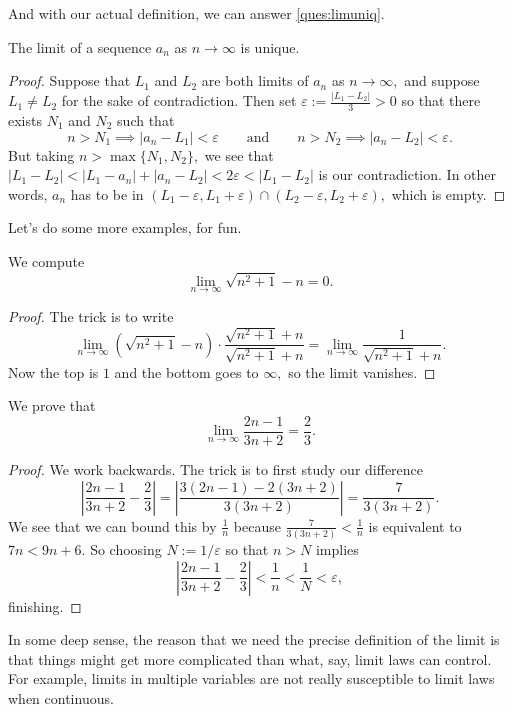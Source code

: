 And with our actual definition, we can answer \autoref{ques:limuniq}.
\begin{proposition}
    The limit of a sequence $a_n$ as $n\to\infty$ is unique.
\end{proposition}
\begin{proof}
    Suppose that $L_1$ and $L_2$ are both limits of $a_n$ as $n\to\infty,$ and suppose $L_1\ne L_2$ for the sake of contradiction. Then set $\varepsilon:=\frac{|L_1-L_2|}3>0$ so that there exists $N_1$ and $N_2$ such that
    \[n>N_1\implies|a_n-L_1|<\varepsilon\qquad\text{and}\qquad n>N_2\implies|a_n-L_2|<\varepsilon.\]
    But taking $n>\max\{N_1,N_2\},$ we see that $|L_1-L_2|<|L_1-a_n|+|a_n-L_2|<2\varepsilon<|L_1-L_2|$ is our contradiction. In other words, $a_n$ has to be in $(L_1-\varepsilon,L_1+\varepsilon)\cap(L_2-\varepsilon,L_2+\varepsilon),$ which is empty.
\end{proof}
Let's do some more examples, for fun.
\begin{exercise}[Ross 7.5(a)]
    We compute
    \[\lim_{n\to\infty}\sqrt{n^2+1}-n=0.\]
\end{exercise}
\begin{proof}
    The trick is to write
    \[\lim_{n\to\infty}\left(\sqrt{n^2+1}-n\right)\cdot\frac{\sqrt{n^2+1}+n}{\sqrt{n^2+1}+n}=\lim_{n\to\infty}\frac1{\sqrt{n^2+1}+n}.\]
    Now the top is $1$ and the bottom goes to $\infty,$ so the limit vanishes.
\end{proof}
\begin{exercise}
    We prove that
    \[\lim_{n\to\infty}\frac{2n-1}{3n+2}=\frac23.\]
\end{exercise}
\begin{proof}
    We work backwards. The trick is to first study our difference
    \[\left|\frac{2n-1}{3n+2}-\frac23\right|=\left|\frac{3(2n-1)-2(3n+2)}{3(3n+2)}\right|=\frac7{3(3n+2)}.\]
    We see that we can bound this by $\frac1n$ because $\frac7{3(3n+2)}<\frac1n$ is equivalent to $7n<9n+6.$ So choosing $\boxed{N:=1/\varepsilon}$ so that $n>N$ implies
    \[\left|\frac{2n-1}{3n+2}-\frac23\right|<\frac1n<\frac1N<\varepsilon,\]
    finishing.
\end{proof}
\begin{remark}[Philosophy]
    In some deep sense, the reason that we need the precise definition of the limit is that things might get more complicated than what, say, limit laws can control. For example, limits in multiple variables are not really susceptible to limit laws when continuous.
\end{remark}
